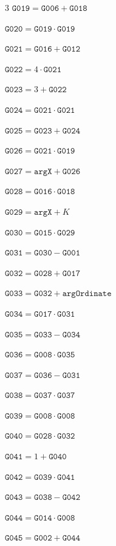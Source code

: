 \documentclass[10pt]{article}
\begin{document}
\begin{multicols}{3}
\noindent $\mathtt{G019}=\mathtt{G006}+\mathtt{G018}$\par
\noindent $\mathtt{G020}=\mathtt{G019}\cdot \mathtt{G019}$\par
\noindent $\mathtt{G021}=\mathtt{G016}+\mathtt{G012}$\par
\noindent $\mathtt{G022}=4\cdot \mathtt{G021}$\par
\noindent $\mathtt{G023}=3+\mathtt{G022}$\par
\noindent $\mathtt{G024}=\mathtt{G021}\cdot \mathtt{G021}$\par
\noindent $\mathtt{G025}=\mathtt{G023}+\mathtt{G024}$\par
\noindent $\mathtt{G026}=\mathtt{G021}\cdot \mathtt{G019}$\par
\noindent $\mathtt{G027}=\mathtt{argX}+\mathtt{G026}$\par
\noindent $\mathtt{G028}=\mathtt{G016}\cdot \mathtt{G018}$\par
\noindent $\mathtt{G029}=\mathtt{argX}+K$\par
\noindent $\mathtt{G030}=\mathtt{G015}\cdot \mathtt{G029}$\par
\noindent $\mathtt{G031}=\mathtt{G030}-\mathtt{G001}$\par
\noindent $\mathtt{G032}=\mathtt{G028}+\mathtt{G017}$\par
\noindent $\mathtt{G033}=\mathtt{G032}+\mathtt{argOrdinate}$\par
\noindent $\mathtt{G034}=\mathtt{G017}\cdot \mathtt{G031}$\par
\noindent $\mathtt{G035}=\mathtt{G033}-\mathtt{G034}$\par
\noindent $\mathtt{G036}=\mathtt{G008}\cdot \mathtt{G035}$\par
\noindent $\mathtt{G037}=\mathtt{G036}-\mathtt{G031}$\par
\noindent $\mathtt{G038}=\mathtt{G037}\cdot \mathtt{G037}$\par
\noindent $\mathtt{G039}=\mathtt{G008}\cdot \mathtt{G008}$\par
\noindent $\mathtt{G040}=\mathtt{G028}\cdot \mathtt{G032}$\par
\noindent $\mathtt{G041}=1+\mathtt{G040}$\par
\noindent $\mathtt{G042}=\mathtt{G039}\cdot \mathtt{G041}$\par
\noindent $\mathtt{G043}=\mathtt{G038}-\mathtt{G042}$\par
\noindent $\mathtt{G044}=\mathtt{G014}\cdot \mathtt{G008}$\par
\noindent $\mathtt{G045}=\mathtt{G002}+\mathtt{G044}$\par

\end{multicols}
\end{document}
